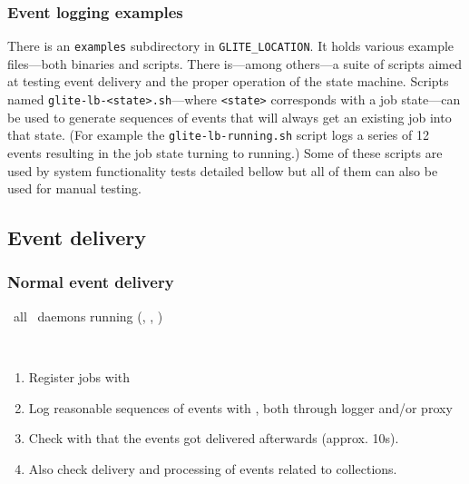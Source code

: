 \subsubsection{Event logging examples}

There is an {\tt examples} subdirectory in {\tt GLITE\_LOCATION}. It holds various example files---both binaries and scripts. There is---among others---a suite of scripts aimed at testing event delivery and the proper operation of the \LB state machine. Scripts named {\tt glite-lb-<state>.sh}---where {\tt <state>} corresponds with a job state---can be used to generate sequences of events that will always get an existing job into that state. (For example the {\tt glite-lb-running.sh} script logs a series of 12 events resulting in the job state turning to running.) Some of these scripts are used by system functionality tests detailed bellow but all of them can also be used for manual testing.

\subsection{Event delivery}

\subsubsection{Normal event delivery}
\label{normal}

\req\ all \LB\ daemons running (, ,
)

\what\ 
\begin{enumerate}
\item Register jobs with  
\item Log reasonable sequences of events with , both through logger and/or proxy
\item Check with \code{edg\_wll\_JobLog} that the events got delivered afterwards (approx. 10s).
\item Also check delivery and processing of events related to collections.
\end{enumerate}

\how\ 
%

